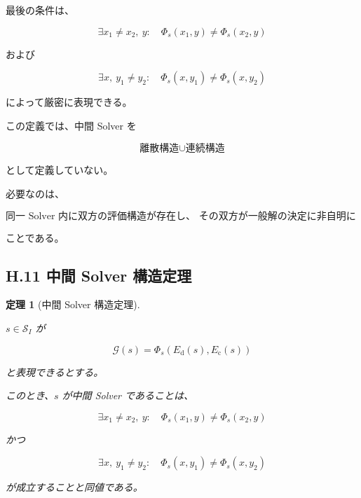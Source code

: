 \documentclass[a4paper,11pt]{article}
\newtheorem{theorem}[definition]{定理}
\newcommand{\Solver}{\mathcal{S}}
\newcommand{\Eval}{\mathcal{G}}
\begin{document}
最後の条件は、

\begin{equation}
    \exists x_1\neq x_2,\ y:
    \quad
    \Phi_s(x_1,y)
    \neq
    \Phi_s(x_2,y)
\end{equation}

および

\begin{equation}
    \exists x,\ y_1\neq y_2:
    \quad
    \Phi_s(x,y_1)
    \neq
    \Phi_s(x,y_2)
\end{equation}

によって厳密に表現できる。

この定義では、中間 Solver を

\begin{equation}
    \text{離散構造}\cup\text{連続構造}
\end{equation}

として定義していない。

必要なのは、

\begin{equation}
    \boxed{
    \text{同一 Solver 内に双方の評価構造が存在し、
    その双方が一般解の決定に非自明に寄与する}
    }
\end{equation}

ことである。


\subsection{H.11 中間 Solver 構造定理}

\begin{theorem}[中間 Solver 構造定理]
\label{thm:middle-solver}

$s\in\Solver_I$ が

\begin{equation}
    \Eval(s)
    =
    \Phi_s(E_{\mathrm d}(s),E_{\mathrm c}(s))
\end{equation}

と表現できるとする。

このとき、$s$ が中間 Solver であることは、

\begin{equation}
    \exists x_1\neq x_2,\ y:
    \quad
    \Phi_s(x_1,y)
    \neq
    \Phi_s(x_2,y)
\end{equation}

かつ

\begin{equation}
    \exists x,\ y_1\neq y_2:
    \quad
    \Phi_s(x,y_1)
    \neq
    \Phi_s(x,y_2)
\end{equation}

が成立することと同値である。
\end{theorem}
\end{document}
